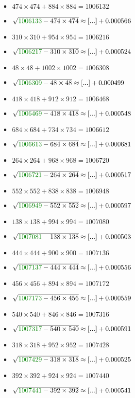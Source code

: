 \documentclass[12pt]{article}
\begin{document}
\begin{multicols}{2}
\begin{itemize}
\item $474×474 + 884×884 = 1006132$
\item $\sqrt{ {\color{green!50!black}{1006133}} - 474\times 474 } \approx [...] + 0.000566$
\item $310×310 + 954×954 = 1006216$
\item $\sqrt{ {\color{green!50!black}{1006217}} - 310\times 310 } \approx [...] + 0.000524$
\item $48×48 + 1002×1002 = 1006308$
\item $\sqrt{ {\color{green!50!black}{1006309}} - 48\times 48 } \approx [...] + 0.000499$
\item $418×418 + 912×912 = 1006468$
\item $\sqrt{ {\color{green!50!black}{1006469}} - 418\times 418 } \approx [...] + 0.000548$
\item $684×684 + 734×734 = 1006612$
\item $\sqrt{ {\color{green!50!black}{1006613}} - 684\times 684 } \approx [...] + 0.000681$
\item $264×264 + 968×968 = 1006720$
\item $\sqrt{ {\color{green!50!black}{1006721}} - 264\times 264 } \approx [...] + 0.000517$
\item $552×552 + 838×838 = 1006948$
\item $\sqrt{ {\color{green!50!black}{1006949}} - 552\times 552 } \approx [...] + 0.000597$
\item $138×138 + 994×994 = 1007080$
\item $\sqrt{ {\color{green!50!black}{1007081}} - 138\times 138 } \approx [...] + 0.000503$
\item $444×444 + 900×900 = 1007136$
\item $\sqrt{ {\color{green!50!black}{1007137}} - 444\times 444 } \approx [...] + 0.000556$
\item $456×456 + 894×894 = 1007172$
\item $\sqrt{ {\color{green!50!black}{1007173}} - 456\times 456 } \approx [...] + 0.000559$
\item $540×540 + 846×846 = 1007316$
\item $\sqrt{ {\color{green!50!black}{1007317}} - 540\times 540 } \approx [...] + 0.000591$
\item $318×318 + 952×952 = 1007428$
\item $\sqrt{ {\color{green!50!black}{1007429}} - 318\times 318 } \approx [...] + 0.000525$
\item $392×392 + 924×924 = 1007440$
\item $\sqrt{ {\color{green!50!black}{1007441}} - 392\times 392 } \approx [...] + 0.000541$

\end{itemize}
\end{multicols}
\end{document}
